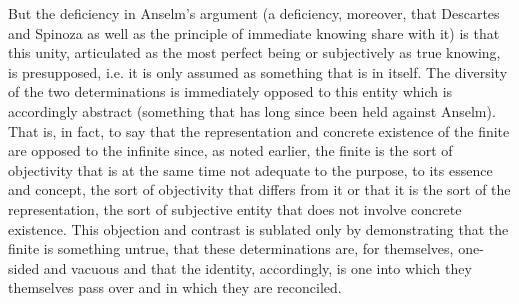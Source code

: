 But the deficiency in Anselm's argument
(a deficiency, moreover, that Descartes and Spinoza
as well as the principle of immediate knowing share with it)
is that this unity, articulated as the most perfect being
or subjectively as true knowing,
is presupposed, i.e. it is only assumed
as something that is in itself.
The diversity of the two determinations is
immediately opposed to this entity
which is accordingly abstract
(something that has long since been held against Anselm).
That is, in fact, to say that the
representation and concrete existence of the finite
are opposed to the infinite since, as noted earlier,
the finite is the sort of objectivity
that is at the same time not adequate
to the purpose, to its essence and concept,
the sort of objectivity that differs from it
or that it is the sort of the representation,
the sort of subjective entity that
does not involve concrete existence.
This objection and contrast is
sublated only by demonstrating
that the finite is something untrue,
that these determinations are,
for themselves, one-sided and vacuous
and that the identity, accordingly,
is one into which they themselves pass over
and in which they are reconciled.
